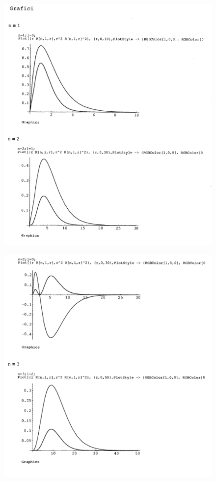 \begin{figure}[!htbp]
\begin{center}
\includegraphics[width= \textwidth]{immagini/cap_21/fig_21_3.png}\\
\end{center}
\end{figure}
\begin{figure}[!htbp]
\begin{center}
\includegraphics[width= \textwidth]{immagini/cap_21/fig_21_4.png}\\
\end{center}
\end{figure}
